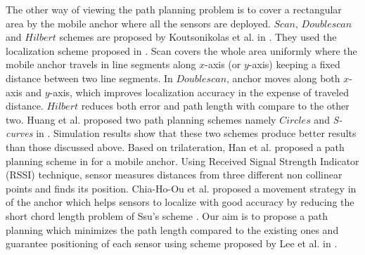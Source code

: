 \documentclass[preprint,11pt]{elsarticle}
\begin{document}
The other way of viewing the path planning problem is to cover a rectangular area
by the mobile anchor where all the sensors are deployed.
$Scan$, $Doublescan$ and $Hilbert$ schemes are proposed by Koutsonikolas et al. in \cite{Koutsonikolas2007}.
They used the localization scheme proposed in \cite{Sichitiu2004}. Scan covers the whole area
uniformly where the mobile anchor travels in line segments along $x$-axis (or $y$-axis) keeping a
fixed distance between two line segments. In $Doublescan$, anchor moves along both $x$-axis
and $y$-axis, which improves localization accuracy in the expense of traveled distance.
$Hilbert$ reduces both error and path length with compare to the other two.
Huang et al. proposed two path planning schemes namely $Circles$ and {\it S-curves} in \cite{Huang2007}.
Simulation results show that these two schemes produce better results than those discussed above.
Based on trilateration, Han et al.  proposed a path planning scheme in \cite{Han2013} for a
mobile anchor. Using Received Signal Strength Indicator (RSSI) technique, sensor measures distances from three
different non collinear points and finds its position. Chia-Ho-Ou et al. proposed
a movement strategy in \cite{Chia-Ho-Ou2013} of the anchor which helps sensors to localize
with good accuracy by reducing the short chord length problem of Ssu's scheme \cite{Ssu2005}.
Our aim is to propose a path planning which minimizes the path length compared to the
existing ones and guarantee positioning of each sensor using scheme
proposed by Lee et al. in \cite{Lee2009}.
\end{document}

